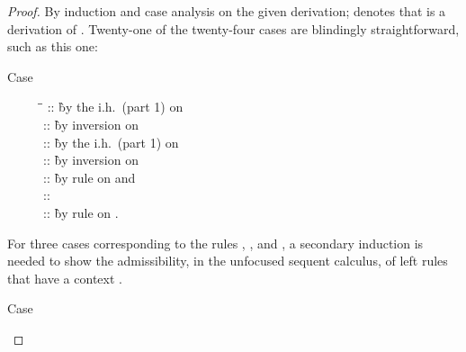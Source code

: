 \documentclass[acmtocl]{robtrans}\pdfoutput=1
\begin{document}
\begin{proof}
By induction and case analysis on the given derivation;
 denotes that  is a
derivation of . Twenty-one of the twenty-four cases
are blindingly straightforward, such as this one:

\begin{description}
\item[Case]


\begin{tabbing}
\qquad \=  \= \kill
\>
 \> :: 
 \` by the i.h.~(part 1) on 
\\
\>
 \> :: 
 \` by inversion on 
\\
\>
 \> :: 
 \` by the i.h.~(part 1) on 
\\
\>
 \> :: 
 \` by inversion on 
\\
\>
 \> :: 
 \` by rule  on  and 
\\
\>
 \> :: 
 \` 
\\
\>
 \> :: 
 \` by rule  on .
\end{tabbing}
\end{description}

\noindent
For three cases corresponding to the rules , , and
, a secondary induction is needed to show the
admissibility, in the unfocused sequent calculus, of left rules that
have a context .

\begin{description}
\item[Case]


\end{description}
\end{proof}
\end{document}
